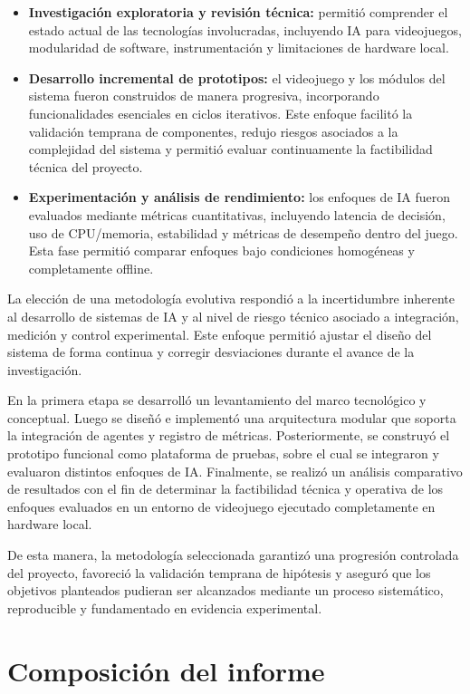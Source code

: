 \begin{itemize}
    \item \textbf{Investigación exploratoria y revisión técnica:} permitió comprender el estado actual de las tecnologías involucradas, incluyendo IA para videojuegos, modularidad de software, instrumentación y limitaciones de hardware local.
    \item \textbf{Desarrollo incremental de prototipos:} el videojuego y los módulos del sistema fueron construidos de manera progresiva, incorporando funcionalidades esenciales en ciclos iterativos. Este enfoque facilitó la validación temprana de componentes, redujo riesgos asociados a la complejidad del sistema y permitió evaluar continuamente la factibilidad técnica del proyecto.
    \item \textbf{Experimentación y análisis de rendimiento:} los enfoques de IA fueron evaluados mediante métricas cuantitativas, incluyendo latencia de decisión, uso de CPU/memoria, estabilidad y métricas de desempeño dentro del juego. Esta fase permitió comparar enfoques bajo condiciones homogéneas y completamente offline.
\end{itemize}

La elección de una metodología evolutiva respondió a la incertidumbre inherente al desarrollo de sistemas de IA y al nivel de riesgo técnico asociado a integración, medición y control experimental. Este enfoque permitió ajustar el diseño del sistema de forma continua y corregir desviaciones durante el avance de la investigación.

En la primera etapa se desarrolló un levantamiento del marco tecnológico y conceptual. Luego se diseñó e implementó una arquitectura modular que soporta la integración de agentes y registro de métricas. Posteriormente, se construyó el prototipo funcional como plataforma de pruebas, sobre el cual se integraron y evaluaron distintos enfoques de IA. Finalmente, se realizó un análisis comparativo de resultados con el fin de determinar la factibilidad técnica y operativa de los enfoques evaluados en un entorno de videojuego ejecutado completamente en hardware local.

De esta manera, la metodología seleccionada garantizó una progresión controlada del proyecto, favoreció la validación temprana de hipótesis y aseguró que los objetivos planteados pudieran ser alcanzados mediante un proceso sistemático, reproducible y fundamentado en evidencia experimental.

\section{Composición del informe}

